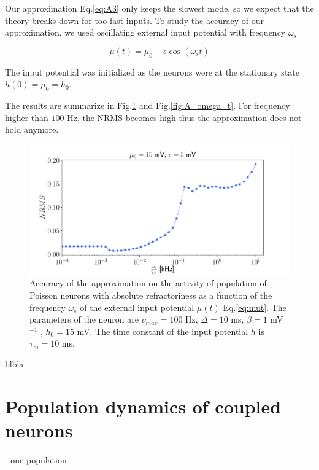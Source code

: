 \documentclass[a4paper,11pt,twoside]{article}
\numberwithin{equation}{section}
\begin{document}
Our approximation Eq.\eqref{eq:A3} only keeps the slowest mode, so we expect that the theory breaks down for too fast inputs. To study the accuracy of our approximation, we used oscillating external input potential with frequency $\omega_s$ 

\begin{equation}
\label{eq:mut}
\mu(t)=\mu_0 + \epsilon \cos(\omega_st)
\end{equation}

The input potential was initialized as the neurons were at the stationary state $h(0)=\mu_0=h_0$. 

The results are summarize in Fig.\ref{fig:NRMSo} and Fig.\ref{fig:A_omega_t}. For frequency higher than $100$ Hz, the NRMS becomes high thus the approximation does not hold anymore.




\begin{figure}[h!]
	\centering
	\includegraphics[width=0.8\linewidth]{NRMSo.pdf}
	\caption{Accuracy of the approximation on the activity of population of Poisson neurons with absolute refractoriness as a function of the frequency $\omega_s$ 
	of the external input potential $\mu(t)$ Eq.\eqref{eq:mut}. The parameters of the neuron are $\nu_{max}=100$ Hz, $\Delta=10$ ms, $\beta=1$ mV$^{-1}$ , $h_0=15$ mV. The time constant of the input potential $h$ is $\tau_m=10$ ms.
 }
	\label{fig:NRMSo}
\end{figure}


blbla \cite{GerKis14}



\chapter{Population dynamics of coupled neurons}

- one population






%
%
%

%
%



\end{document}
